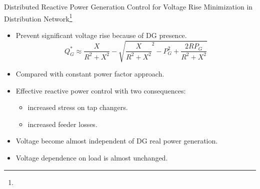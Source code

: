 \documentclass[10pt]{beamer}
\begin{document}

\begin{frame}{Distributed Reactive Power Generation Control for Voltage Rise Minimization in Distribution Network\footnote{}}
\begin{itemize}
\item Prevent significant voltage rise because of DG presence.
\[
Q_G^*  \approx \frac{X}{R^2 + X^2} - \sqrt{\frac{X}{R^2 + X^2}^2 - P_G^2 + \frac{2RP_G}{R^2 + X^2}  }
\]
\item Compared with constant power factor approach.
\item Effective reactive power control with two consequences:
   \begin{itemize}
   \item increased stress on tap changers.
   \item increased feeder losses.
   \end{itemize}
\item Voltage become almost independent of DG real power generation.
\item Voltage dependence on load is almost unchanged.
\end{itemize}
\end{frame}


%
%
\end{document}
